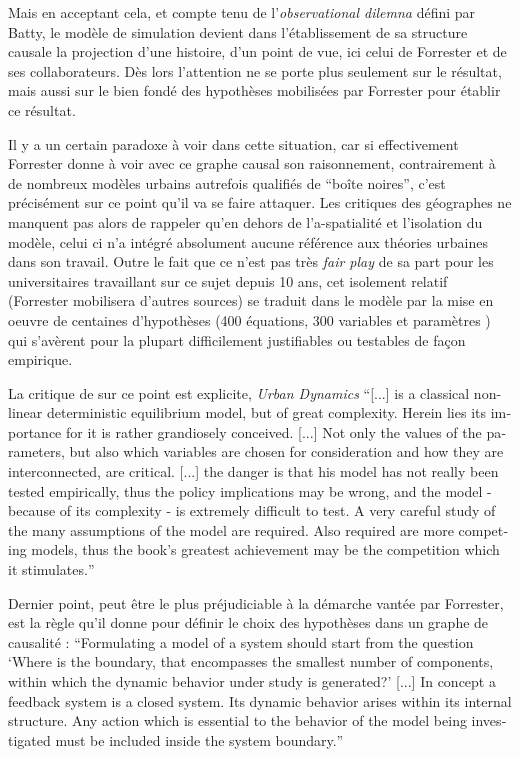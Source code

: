 Mais en acceptant cela, et compte tenu de l'\textit{observational dilemna} défini par Batty, le modèle de simulation devient dans l'établissement de sa structure causale la projection d'une histoire, d'un point de vue, ici celui de Forrester et de ses collaborateurs. Dès lors l'attention ne se porte plus seulement sur le résultat, mais aussi sur le bien fondé des hypothèses mobilisées par Forrester pour établir ce résultat.

Il y a un certain paradoxe à voir dans cette situation, car si effectivement Forrester donne à voir avec ce graphe causal son raisonnement, contrairement à de nombreux modèles urbains autrefois qualifiés de \enquote{boîte noires}, c'est précisément sur ce point qu'il va se faire attaquer. Les critiques des géographes ne manquent pas alors de rappeler qu'en dehors de l'a-spatialité et l'isolation du modèle, celui ci n'a intégré absolument aucune référence aux théories urbaines dans son travail. Outre le fait que ce n'est pas très \textit{fair play} de sa part pour les universitaires travaillant sur ce sujet depuis 10 ans, cet isolement relatif (Forrester mobilisera d'autres sources) se traduit dans le modèle par la mise en oeuvre de centaines d'hypothèses (400 équations, 300 variables et paramètres \autocite[63]{Pumain1989}) qui s'avèrent pour la plupart difficilement justifiables ou testables de façon empirique. \autocite[307]{Batty1976}

La critique de \textcite{Tobler1970a} sur ce point est explicite, \textit{Urban Dynamics} \foreignquote{english}{[...] is a classical non-linear deterministic equilibrium model, but of great complexity. Herein lies its importance for it is rather grandiosely conceived. [...] Not only the values of the parameters, but also which variables are chosen for consideration and how they are interconnected, are critical. [...] the danger is that his model has not really been tested empirically, thus the policy implications may be wrong, and the model - because of its complexity - is extremely difficult to test. A very careful study of the many assumptions of the model are required. Also required are more competing models, thus the book’s greatest achievement may be the competition which it stimulates.}

Dernier point, peut être le plus préjudiciable à la démarche vantée par Forrester, est la règle qu'il donne pour définir le choix des hypothèses dans un graphe de causalité : \foreignquote{english}{Formulating a model of a system should start from the question \enquote{Where is the boundary, that encompasses the smallest number of components, within which the dynamic behavior under study is generated?} [...] In concept a feedback system is a closed system. Its dynamic behavior arises within its internal structure. Any action which is essential to the behavior of the model being investigated must be included inside the system boundary.} \autocite{Forrester1968b, Richardson2011}

